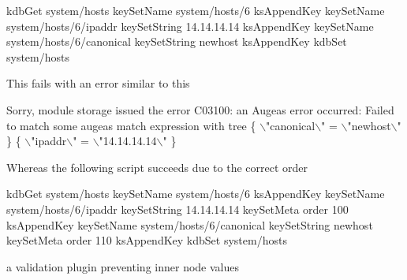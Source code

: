 \begin{DoxyCode}
kdbGet system/hosts
keySetName system/hosts/6
ksAppendKey
keySetName system/hosts/6/ipaddr
keySetString 14.14.14.14
ksAppendKey
keySetName system/hosts/6/canonical
keySetString newhost
ksAppendKey
kdbSet system/hosts
\end{DoxyCode}


This fails with an error similar to this


\begin{DoxyCode}
Sorry, module storage issued the error C03100:
an Augeas error occurred: Failed to match
some augeas match expression
with tree
\{ \(\backslash\)"canonical\(\backslash\)" = \(\backslash\)"newhost\(\backslash\)" \} \{ \(\backslash\)"ipaddr\(\backslash\)" = \(\backslash\)"14.14.14.14\(\backslash\)" \}
\end{DoxyCode}


Whereas the following script succeeds due to the correct order


\begin{DoxyCode}
kdbGet system/hosts
keySetName system/hosts/6
ksAppendKey
keySetName system/hosts/6/ipaddr
keySetString 14.14.14.14
keySetMeta order 100
ksAppendKey
keySetName system/hosts/6/canonical
keySetString newhost
keySetMeta order 110
ksAppendKey
kdbSet system/hosts
\end{DoxyCode}



\begin{DoxyItemize}
\item a validation plugin preventing inner node values 
\end{DoxyItemize}
